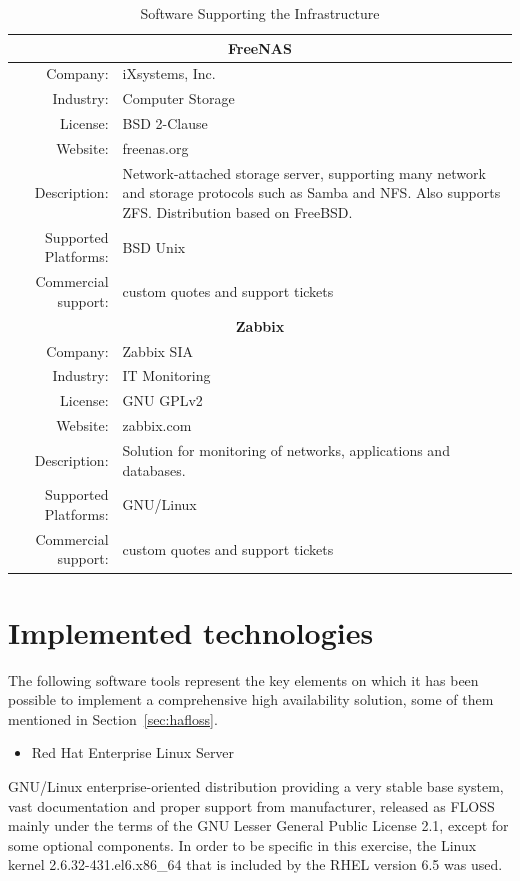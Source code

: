 \documentclass[a4paper, 12pt]{book}
\begin{document}
\begin{table}
\begin{tabular}{ | r m{10cm} | }
    \hline    
    \multicolumn{2}{|c|}{\textbf{FreeNAS}}\\
    \hline
    Company: & iXsystems, Inc. \\
    Industry: & Computer Storage \\
    License: & BSD 2-Clause \\
    Website: & freenas.org \\
    Description: & Network-attached storage server, supporting many network and storage protocols such as Samba and NFS. Also supports ZFS. Distribution based on FreeBSD. \\
    Supported Platforms: & BSD Unix \\
    Commercial support: & custom quotes and support tickets \\
    \hline
    \multicolumn{2}{|c|}{\textbf{Zabbix}}\\
    \hline
    Company: & Zabbix SIA \\
    Industry: & IT Monitoring \\
    License: & GNU GPLv2 \\
    Website: & zabbix.com \\
    Description: & Solution for monitoring of networks, applications and databases. \\
    Supported Platforms: & GNU/Linux \\
    Commercial support: & custom quotes and support tickets \\
    \hline
  \end{tabular}
\caption{Software Supporting the Infrastructure}
\label{table:technologies}
\end{table}



%
\chapter{Implemented technologies}
\label{chap:implemented}

The following software tools represent the key elements on which it has been possible to implement a comprehensive high availability solution, some of them mentioned in Section~\ref{sec:hafloss}.

\begin{itemize}
	\item Red Hat Enterprise Linux Server
\end{itemize}

\noindent GNU/Linux enterprise-oriented distribution providing a very stable base system, vast documentation and proper support from manufacturer, released as FLOSS mainly under the terms of the GNU Lesser General Public License 2.1, except for some optional components. In order to be specific in this exercise, the Linux kernel 2.6.32-431.el6.x86\_64 that is included by the RHEL version 6.5 was used.
\end{document}
